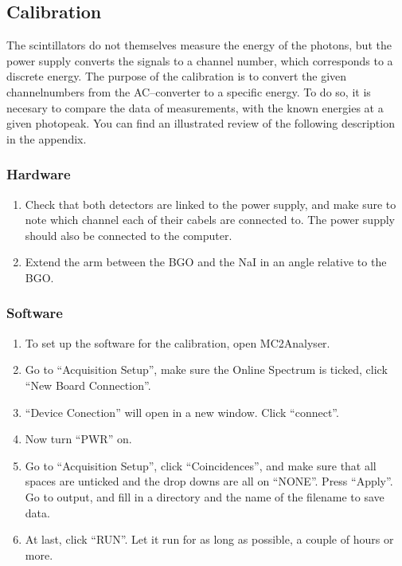 \documentclass[a4paper, oneside, onecolumn, 11pt]{memoir}
\begin{document}
\subsection{Calibration}
The scintillators do not themselves measure the energy of the photons, but the power supply converts the signals to a channel number, which corresponds to a discrete energy. The purpose of the calibration is to convert the given channelnumbers from the AC–converter to a specific energy.  To do so, it is necesary to compare the data of measurements, with the known energies at a given photopeak. You can find an illustrated review of the following description in the appendix.  

\subsubsection{Hardware}
\begin{enumerate}
\item Check that both detectors are linked to the power supply, and make sure
    to note which channel each of their cabels are connected to. The power
    supply should also be connected to the computer.
\item Extend the arm between the BGO and the NaI in an angle relative to the
    BGO.
\end{enumerate}

\subsubsection{Software}
\begin{enumerate}
\item To set up the software for the calibration, open MC2Analyser.
\item Go to “Acquisition Setup”, make sure the Online Spectrum is ticked, click
    “New Board Connection”.
\item “Device Conection” will open in a new window. Click “connect”.
\item Now turn “PWR” on.
\item Go to “Acquisition Setup”, click “Coincidences”, and make sure that all
    spaces are unticked and the drop downs are all on “NONE”. Press “Apply”. Go
    to output, and fill in a directory and the name of the filename to save
    data.
\item At last, click “RUN”. Let it run for as long as possible, a couple of
    hours or more.
\end{enumerate}
\end{document}
